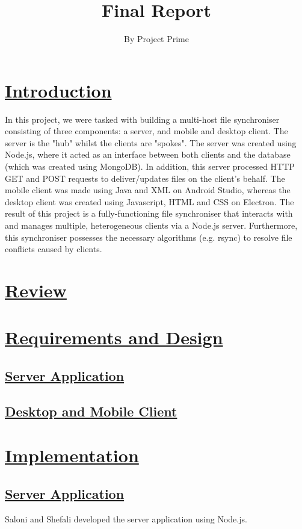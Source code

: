 \documentclass{article}
\title{Final Report}
\author{By Project Prime}
\begin{document}
 \maketitle
 \section{\underline{Introduction}}
In this project, we were tasked with building a multi-host file synchroniser consisting of three components: a server, and mobile and desktop client. The server is the "hub" whilst the clients are "spokes". The server was created using Node.js, where it acted as an interface between both clients and the database (which was created using MongoDB). In addition, this server processed HTTP GET and POST requests to deliver/updates files on the client's behalf. The mobile client was made using Java and XML on Android Studio, whereas the desktop client was created using Javascript, HTML and CSS on Electron. The result of this project is a fully-functioning file synchroniser that interacts with and manages multiple, heterogeneous clients via a Node.js server. Furthermore, this synchroniser possesses the necessary algorithms (e.g. rsync) to resolve file conflicts caused by clients. 

\section{\underline{Review}}

\section{\underline{Requirements and Design}}

\subsection{\underline{Server Application}}

\subsection{\underline{Desktop and Mobile Client}}

\section{\underline{Implementation}}

\subsection{\underline{Server Application}}
Saloni and Shefali developed the server application using Node.js.
\end{document}

